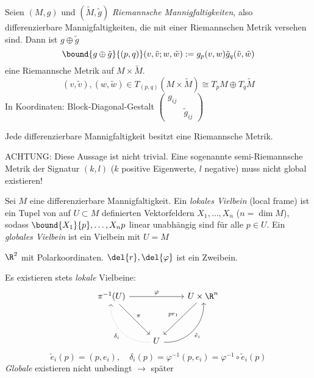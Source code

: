 \begin{defn}
	Seien $ (M,g) $ und $ (\tilde{M},\tilde{g}) $ \emph{Riemannsche Mannigfaltigkeiten}, also differenzierbare Mannigfaltigkeiten, die mit einer Riemannschen Metrik versehen sind. Dann ist $g \oplus \tilde{g}$
	\[ \bound{g \oplus \tilde{g}}{(p,q)}(v,\tilde{v};w,\tilde{w}) := g_p(v,w) \tilde{g}_q(\tilde{v},\tilde{w}) \]
	eine Riemannsche Metrik auf $M \times \tilde{M}$.
	\[ (v,\tilde{v}),(w,\tilde{w}) \in T_{(p,q)}(M \times \tilde{M}) \cong T_pM \oplus T_q\tilde{M} \]
	In Koordinaten: Block-Diagonal-Gestalt $ \begin{pmatrix}
		g_{ij} & \\ & \tilde{g}_{ij}
	\end{pmatrix} $
\end{defn}

\begin{thm}
	Jede differenzierbare Mannigfaltigkeit besitzt eine Riemannsche Metrik.
\end{thm}

\begin{rem*}
	ACHTUNG: Diese Aussage ist nicht trivial. Eine sogenannte semi-Riemannsche Metrik der Signatur $(k,l)$ ($k$ positive Eigenwerte, $l$ negative) muss nicht global existieren!
\end{rem*}

\begin{defn*}
	Sei $M$ eine differenzierbare Mannigfaltigkeit. Ein \emph{lokales Vielbein} (local frame) ist ein Tupel von auf $U \subset M$ definierten Vektorfeldern $ X_1,\dotsc,X_n $ ($n = \dim M$), sodass $ \bound{X_1}{p}, \dotsc, {X_n}{p} $ linear unabhängig sind für alle $p \in U$. Ein \emph{globales Vielbein} ist ein Vielbein mit $U = M$
\end{defn*}

\begin{exmp*}
	$\R^2$ mit Polarkoordinaten. $ \del{r},\del{\varphi} $ ist ein Zweibein.
\end{exmp*}

\begin{rem}\label{6.4}
	Es existieren stets \emph{lokale} Vielbeine:
	\[ \begin{tikzcd}
		\pi^{-1}(U) \arrow{rr}{\varphi} \arrow{ddr}{\pi} & & U \times \R^n \arrow{ddl}[swap]{pr_1}\\
		&&\\
		& U \arrow[bend left = 50, dotted]{luu}{\delta_i} \arrow[bend right=50]{uur}[swap]{\tilde{e}_i} &
	\end{tikzcd} \]
	\[ \tilde{e}_i(p) = (p,e_i),\quad \delta_i(p) = \varphi^{-1} (p,e_i) = \varphi^{-1} \circ \tilde{e}_i(p) \]
	\emph{Globale} existieren nicht unbedingt $\rightarrow$ später
\end{rem}


